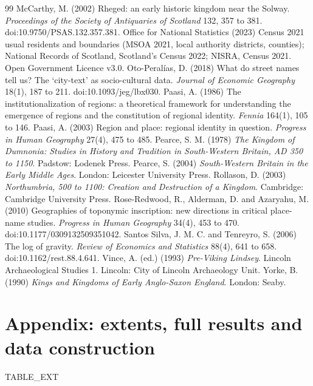 \documentclass[11pt,a4paper]{article}
\begin{document}
\begin{thebibliography}{99}
 McCarthy, M. (2002) Rheged: an early historic kingdom near the Solway. \textit{Proceedings of the Society of Antiquaries of Scotland} 132, 357 to 381. doi:10.9750/PSAS.132.357.381.
 Office for National Statistics (2023) Census 2021 usual residents and boundaries (MSOA 2021, local authority districts, counties); National Records of Scotland, Scotland's Census 2022; NISRA, Census 2021. Open Government Licence v3.0.
 Oto-Peralías, D. (2018) What do street names tell us? The `city-text' as socio-cultural data. \textit{Journal of Economic Geography} 18(1), 187 to 211. doi:10.1093/jeg/lbx030.
 Paasi, A. (1986) The institutionalization of regions: a theoretical framework for understanding the emergence of regions and the constitution of regional identity. \textit{Fennia} 164(1), 105 to 146.
 Paasi, A. (2003) Region and place: regional identity in question. \textit{Progress in Human Geography} 27(4), 475 to 485.
 Pearce, S. M. (1978) \textit{The Kingdom of Dumnonia: Studies in History and Tradition in South-Western Britain, AD 350 to 1150}. Padstow: Lodenek Press.
 Pearce, S. (2004) \textit{South-Western Britain in the Early Middle Ages}. London: Leicester University Press.
 Rollason, D. (2003) \textit{Northumbria, 500 to 1100: Creation and Destruction of a Kingdom}. Cambridge: Cambridge University Press.
 Rose-Redwood, R., Alderman, D. and Azaryahu, M. (2010) Geographies of toponymic inscription: new directions in critical place-name studies. \textit{Progress in Human Geography} 34(4), 453 to 470. doi:10.1177/0309132509351042.
 Santos Silva, J. M. C. and Tenreyro, S. (2006) The log of gravity. \textit{Review of Economics and Statistics} 88(4), 641 to 658. doi:10.1162/rest.88.4.641.
 Vince, A. (ed.) (1993) \textit{Pre-Viking Lindsey}. Lincoln Archaeological Studies 1. Lincoln: City of Lincoln Archaeology Unit.
 Yorke, B. (1990) \textit{Kings and Kingdoms of Early Anglo-Saxon England}. London: Seaby.
\end{thebibliography}

\appendix
\section{Appendix: extents, full results and data construction}
{{TABLE_EXT}}
\end{document}
